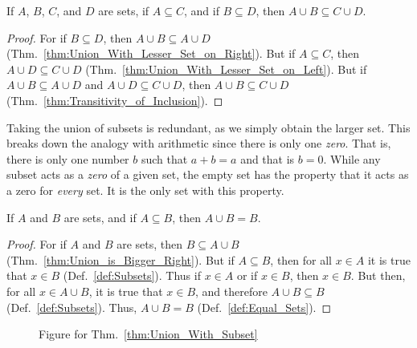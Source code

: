        \begin{theorem}
            \label{thm:A_cup_B_Subset_C_cup_D}%
            If $A$, $B$, $C$, and $D$ are sets, if $A\subseteq{C}$, and if
            $B\subseteq{D}$, then $A\cup{B}\subseteq{C}\cup{D}$.
        \end{theorem}
        \begin{proof}
            For if $B\subseteq{D}$, then $A\cup{B}\subseteq{A}\cup{D}$
            (Thm.~\ref{thm:Union_With_Lesser_Set_on_Right}). But if
            $A\subseteq{C}$, then $A\cup{D}\subseteq{C}\cup{D}$
            (Thm.~\ref{thm:Union_With_Lesser_Set_on_Left}). But if
            $A\cup{B}\subseteq{A}\cup{D}$ and $A\cup{D}\subseteq{C}\cup{D}$,
            then $A\cup{B}\subseteq{C}\cup{D}$
            (Thm.~\ref{thm:Transitivity_of_Inclusion}).
        \end{proof}
        Taking the union of subsets is redundant, as we simply obtain the larger
        set. This breaks down the analogy with arithmetic since there is only
        one \textit{zero}. That is, there is only one number $b$ such that
        $a+b=a$ and that is $b=0$. While any subset acts as a \textit{zero} of
        a given set, the empty set has the property that it acts as a zero for
        \textit{every} set. It is the only set with this property.
        \begin{theorem}
            \label{thm:Union_With_Subset}%
            If $A$ and $B$ are sets, and if $A\subseteq{B}$, then $A\cup{B}=B$.
        \end{theorem}
        \begin{proof}
            For if $A$ and $B$ are sets, then $B\subseteq{A}\cup{B}$
            (Thm.~\ref{thm:Union_is_Bigger_Right}). But if $A\subseteq{B}$, then
            for all $x\in{A}$ it is true that $x\in{B}$
            (Def.~\ref{def:Subsets}). Thus if $x\in{A}$ or if $x\in{B}$, then
            $x\in{B}$. But then, for all $x\in{A}\cup{B}$, it is true that
            $x\in{B}$, and therefore $A\cup{B}\subseteq{B}$
            (Def.~\ref{def:Subsets}). Thus, $A\cup{B}=B$
            (Def.~\ref{def:Equal_Sets}).
        \end{proof}
        \begin{figure}[H]
            \centering
            \captionsetup{type=figure}
            
            \caption{Figure for Thm.~\ref{thm:Union_With_Subset}}
            \label{fig:Thm_Union_with_Subset}
        \end{figure}
